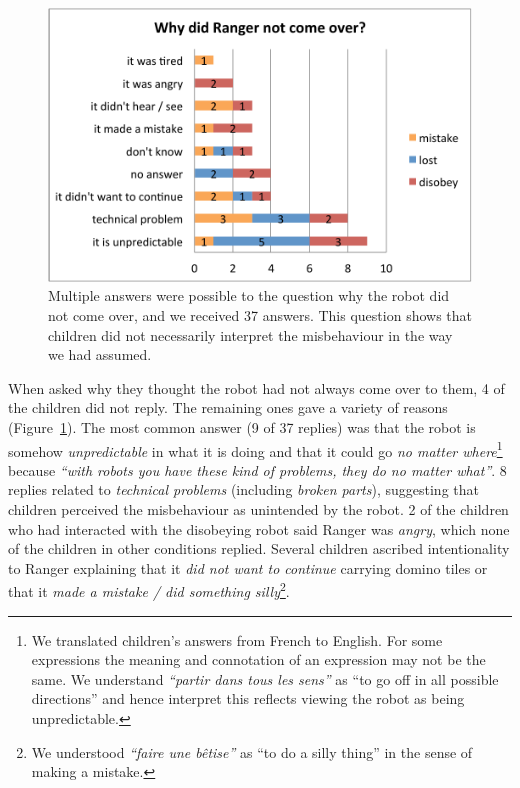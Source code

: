 \documentclass{sig-alternate}
\begin{document}
\begin{figure}[!h]
    \centering
    \includegraphics[width=1.0\linewidth]{domino-why-misbehavior.pdf}   
    \caption[Why Did the Robot Misbehave?]{\small Multiple answers were possible
    to the question why the robot did not come over, and we received 37 answers.
    This question shows that children did not necessarily interpret the misbehaviour
    in the way we had assumed.}

    \label{fig:domino-why-misbehaviour}
\end{figure}	

When asked why they thought the robot had not always come
over to them, 4 of the children did not reply. The remaining ones gave a variety
of reasons (Figure~\ref{fig:domino-why-misbehaviour}). The most common answer (9
of 37 replies) was that the robot is somehow \textit{unpredictable} in what it
is doing and that it could go \textit{no matter where}\footnote{We translated
children's answers from French to English. For some expressions the meaning
and connotation of an expression may not be the same. We understand
\textit{``partir dans tous les sens''} as ``to go off in all possible
directions'' and hence interpret this reflects viewing the robot as being
unpredictable.} because \textit{``with robots you have these kind of problems,
they do no matter what''}. 8 replies related to \textit{technical problems}
(including \textit{broken parts}), suggesting that children perceived the
misbehaviour as unintended by the robot. 2 of the children who had interacted
with the disobeying robot said Ranger was \textit{angry}, which none of the
children in other conditions replied. Several children ascribed intentionality
to Ranger explaining that it \textit{did not want to continue} carrying domino
tiles or that it \textit{made a mistake / did something silly}\footnote{We
understood \textit{``faire une bêtise''} as ``to do a silly thing'' in the sense
of making a mistake.}.
\end{document}
